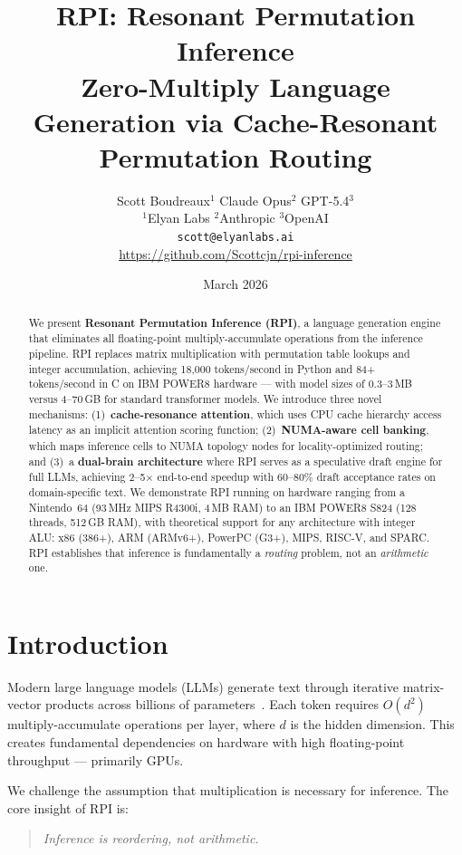 \documentclass[10pt,twocolumn]{article}
\title{\textbf{RPI: Resonant Permutation Inference}\\
\large Zero-Multiply Language Generation via Cache-Resonant Permutation Routing}
\author{
Scott Boudreaux$^{1}$ \quad Claude Opus$^{2}$ \quad GPT-5.4$^{3}$ \\
$^{1}$Elyan Labs \quad $^{2}$Anthropic \quad $^{3}$OpenAI \\
\texttt{scott@elyanlabs.ai} \\
\url{https://github.com/Scottcjn/rpi-inference}
}
\date{March 2026}
\begin{document}
\maketitle

\begin{abstract}
We present \textbf{Resonant Permutation Inference (RPI)}, a language generation engine that eliminates all floating-point multiply-accumulate operations from the inference pipeline. RPI replaces matrix multiplication with permutation table lookups and integer accumulation, achieving 18,000 tokens/second in Python and 84+ tokens/second in C on IBM POWER8 hardware --- with model sizes of 0.3--3\,MB versus 4--70\,GB for standard transformer models. We introduce three novel mechanisms: (1)~\textbf{cache-resonance attention}, which uses CPU cache hierarchy access latency as an implicit attention scoring function; (2)~\textbf{NUMA-aware cell banking}, which maps inference cells to NUMA topology nodes for locality-optimized routing; and (3)~a \textbf{dual-brain architecture} where RPI serves as a speculative draft engine for full LLMs, achieving 2--5$\times$ end-to-end speedup with 60--80\% draft acceptance rates on domain-specific text. We demonstrate RPI running on hardware ranging from a Nintendo~64 (93\,MHz MIPS R4300i, 4\,MB RAM) to an IBM POWER8 S824 (128 threads, 512\,GB RAM), with theoretical support for any architecture with integer ALU: x86 (386+), ARM (ARMv6+), PowerPC (G3+), MIPS, RISC-V, and SPARC. RPI establishes that inference is fundamentally a \emph{routing} problem, not an \emph{arithmetic} one.
\end{abstract}

\section{Introduction}
\label{sec:intro}

Modern large language models (LLMs) generate text through iterative matrix-vector products across billions of parameters~\cite{vaswani2017attention, touvron2023llama}. Each token requires $O(d^2)$ multiply-accumulate operations per layer, where $d$ is the hidden dimension. This creates fundamental dependencies on hardware with high floating-point throughput --- primarily GPUs.

We challenge the assumption that multiplication is necessary for inference. The core insight of RPI is:

\begin{quote}
\emph{Inference is reordering, not arithmetic.}
\end{quote}
\end{document}
